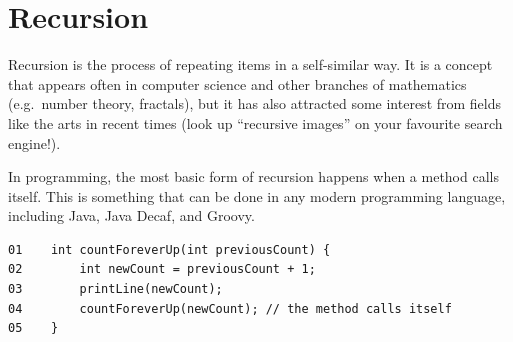 \section{Recursion}
\label{sec:recursion}

Recursion is the process of repeating items in a self-similar way. It
is a concept that appears often in computer science and other branches
of mathematics (e.g.~number theory, fractals), but it has also
attracted some interest from fields like the arts in recent times
(look up ``recursive images'' on your favourite search engine!). 

In programming, the most basic form of recursion happens when a method
calls itself. This is something that can be done in any modern 
programming language, including
Java, Java Decaf, and Groovy. 

% 
%
%
%

\label{neverends}
\begin{verbatim}
01    int countForeverUp(int previousCount) {
02        int newCount = previousCount + 1;
03        printLine(newCount);
04        countForeverUp(newCount); // the method calls itself
05    }
\end{verbatim}

